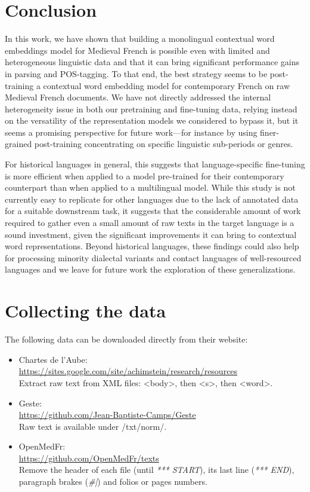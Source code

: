 \section{Conclusion}

In this work, we have shown that building a monolingual contextual word embeddings model for Medieval French is possible even with limited and heterogeneous linguistic data and that it can bring significant performance gains in parsing and POS-tagging.
To that end, the best strategy seems to be post-training a contextual word embedding model for contemporary French on raw Medieval French documents.
We have not directly addressed the internal heterogeneity issue in both our pretraining and fine-tuning data, relying instead on the versatility of the representation models we considered to bypass it, but it seems a promising perspective for future work---for instance by using finer-grained post-training concentrating on specific linguistic sub-periods or genres.

For historical languages in general, this suggests that language-specific fine-tuning is more efficient when applied to a model pre-trained for their contemporary counterpart than when applied to a multilingual model.
While this study is not currently easy to replicate for other languages due to the lack of annotated data for a suitable downstream task, it suggests that the considerable amount of work required to gather even a small amount of raw texts in the target language is a sound investment, given the significant improvements it can bring to contextual word representations.
Beyond historical languages, these findings could also help for processing minority dialectal variants and contact languages of well-resourced languages and we leave for future work the exploration of these generalizations.

\section{Collecting the data}
\label{subsec:collectdata}
The following data can be downloaded directly from their website:
\begin{itemize}
    \item Chartes de l'Aube: \\ \url{https://sites.google.com/site/achimstein/research/resources} \\
          Extract raw text from XML files: <body>, then <s>, then <word>.
    \item Geste: \\ \url{https://github.com/Jean-Baptiste-Camps/Geste} \\
          Raw text is available under /txt/norm/.
    \item OpenMedFr: \\ \url{https://github.com/OpenMedFr/texts} \\
          Remove the header of each file (until \textit{*** START}), its last line (\textit{*** END}), paragraph brakes (\textit{\#|}) and folios or pages numbers.
\end{itemize}

